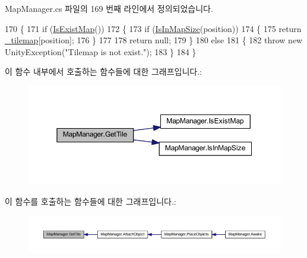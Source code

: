 Map\+Manager.\+cs 파일의 169 번째 라인에서 정의되었습니다.


\begin{DoxyCode}
170     \{
171         \textcolor{keywordflow}{if} (\hyperlink{class_map_manager_a9a18efae73b0d690d2bc6c8ac8703a02}{IsExistMap}())
172         \{
173             \textcolor{keywordflow}{if} (\hyperlink{class_map_manager_a504d7a68ace64557bc3c3254a8b1cddc}{IsInMapSize}(position))
174             \{
175                 \textcolor{keywordflow}{return} \hyperlink{class_map_manager_a58f7635d8e19795f3845a3f85e2b4ac3}{\_tilemap}[position];
176             \}
177 
178             \textcolor{keywordflow}{return} null;
179         \}
180         \textcolor{keywordflow}{else}
181         \{
182             \textcolor{keywordflow}{throw} \textcolor{keyword}{new} UnityException(\textcolor{stringliteral}{"Tilemap is not exist."});
183         \}
184     \}
\end{DoxyCode}


이 함수 내부에서 호출하는 함수들에 대한 그래프입니다.\+:\nopagebreak
\begin{figure}[H]
\begin{center}
\leavevmode
\includegraphics[width=350pt]{class_map_manager_ae457099efdd1a804add3b851b2bc7691_cgraph}
\end{center}
\end{figure}




이 함수를 호출하는 함수들에 대한 그래프입니다.\+:\nopagebreak
\begin{figure}[H]
\begin{center}
\leavevmode
\includegraphics[width=350pt]{class_map_manager_ae457099efdd1a804add3b851b2bc7691_icgraph}
\end{center}
\end{figure}


